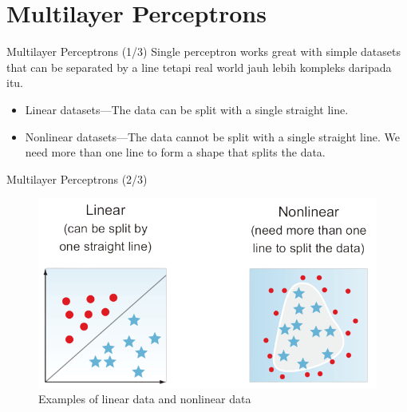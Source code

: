 \documentclass{beamer}
\begin{document}
\section{Multilayer Perceptrons}
\begin{frame}{Multilayer Perceptrons (1/3)}
	Single perceptron works great with simple datasets that can be separated by a line tetapi real world jauh lebih kompleks daripada itu.
	
	\begin{itemize}
		\item<2-> Linear datasets---The data can be split with a single straight line. 
		\item<3-> Nonlinear datasets---The data cannot be split with a single straight line. We need more than one line to form a shape that splits the data.
	\end{itemize}
\end{frame}

\begin{frame}{Multilayer Perceptrons (2/3)}
	\begin{figure}[ht]
		\centering
		\includegraphics[scale=0.4]{images/linear-vs-nonlinear}
		\caption{Examples of linear data and nonlinear data}
	\end{figure}					
\end{frame}
\end{document}
